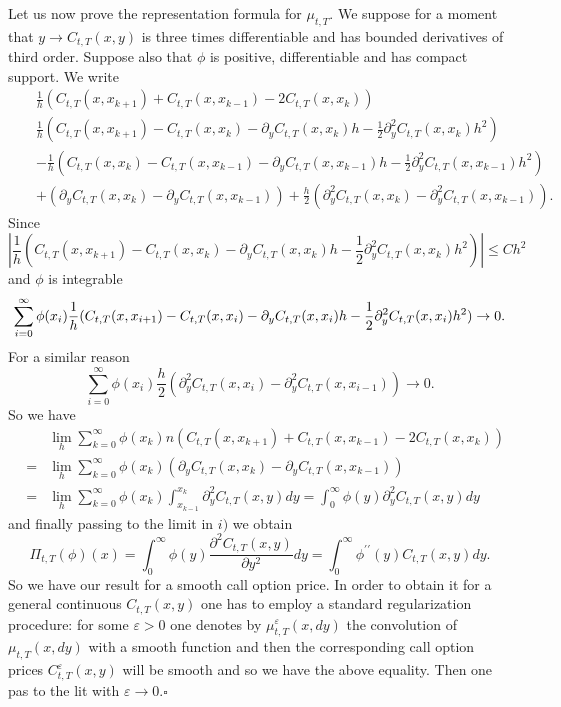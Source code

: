 \documentclass[a4paper]{article}
\begin{document}
Let us now prove the representation formula for $\mu _{t,T}.$ We suppose for
a moment that $y\rightarrow C_{t,T}(x,y)$ is three times differentiable and
has bounded derivatives of third order. Suppose also that $\phi $ is
positive, differentiable and has compact support. We write
\begin{eqnarray*}
&&\frac{1}{h}(C_{t,T}(x,x_{k+1})+C_{t,T}(x,x_{k-1})-2C_{t,T}(x,x_{k})) \\
&&\frac{1}{h}(C_{t,T}(x,x_{k+1})-C_{t,T}(x,x_{k})-\partial
_{y}C_{t,T}(x,x_{k})h-\frac{1}{2}\partial _{y}^{2}C_{t,T}(x,x_{k})h^{2}) \\
&&-\frac{1}{h}(C_{t,T}(x,x_{k})-C_{t,T}(x,x_{k-1})-\partial
_{y}C_{t,T}(x,x_{k-1})h-\frac{1}{2}\partial _{y}^{2}C_{t,T}(x,x_{k-1})h^{2})
\\
&&+(\partial _{y}C_{t,T}(x,x_{k})-\partial _{y}C_{t,T}(x,x_{k-1}))+\frac{h}{2%
}(\partial _{y}^{2}C_{t,T}(x,x_{k})-\partial _{y}^{2}C_{t,T}(x,x_{k-1})).
\end{eqnarray*}
Since
\[
\left| \frac{1}{h}(C_{t,T}(x,x_{k+1})-C_{t,T}(x,x_{k})-\partial
_{y}C_{t,T}(x,x_{k})h-\frac{1}{2}\partial
_{y}^{2}C_{t,T}(x,x_{k})h^{2})\right| \leq Ch^{2}
\]
and $\phi $ is integrable
\[
\sum_{i=0}^{\infty }\phi (x_{i})\frac{1}{h}%
(C_{t,T}(x,x_{i+1})-C_{t,T}(x,x_{i})-\partial _{y}C_{t,T}(x,x_{i})h-\frac{1}{%
2}\partial _{y}^{2}C_{t,T}(x,x_{i})h^{2})\rightarrow 0.
\]
For a similar reason
\[
\sum_{i=0}^{\infty }\phi (x_{i})\frac{h}{2}(\partial
_{y}^{2}C_{t,T}(x,x_{i})-\partial _{y}^{2}C_{t,T}(x,x_{i-1}))\rightarrow 0.
\]
So we have
\begin{eqnarray*}
&&\lim_{h}\sum_{k=0}^{\infty }\phi
(x_{k})n(C_{t,T}(x,x_{k+1})+C_{t,T}(x,x_{k-1})-2C_{t,T}(x,x_{k})) \\
&=&\lim_{h}\sum_{k=0}^{\infty }\phi (x_{k})(\partial
_{y}C_{t,T}(x,x_{k})-\partial _{y}C_{t,T}(x,x_{k-1})) \\
&=&\lim_{h}\sum_{k=0}^{\infty }\phi (x_{k})\int_{x_{k-1}}^{x_{k}}\partial
_{y}^{2}C_{t,T}(x,y)dy=\int_{0}^{\infty }\phi (y)\partial
_{y}^{2}C_{t,T}(x,y)dy
\end{eqnarray*}
and finally passing to the limit in $i)$ we obtain
\[
\Pi _{t,T}(\phi )(x)=\int_{0}^{\infty }\phi (y)\frac{\partial
^{2}C_{t,T}(x,y)}{\partial y^{2}}dy=\int_{0}^{\infty }\phi ^{\prime \prime
}(y)C_{t,T}(x,y)dy.
\]
So we have our result for a smooth call option price. In order to obtain it
for a general continuous $C_{t,T}(x,y)$ one has to employ a standard
regularization procedure: for some $\varepsilon >0$ one denotes by $\mu
_{t,T}^{\varepsilon }(x,dy)$ the convolution of $\mu _{t,T}(x,dy)$ with a
smooth function and then the corresponding call option prices $%
C_{t,T}^{\varepsilon }(x,y)$ will be smooth and so we have the above
equality. Then one pas to the lit with $\varepsilon \rightarrow 0.\square $
\end{document}
